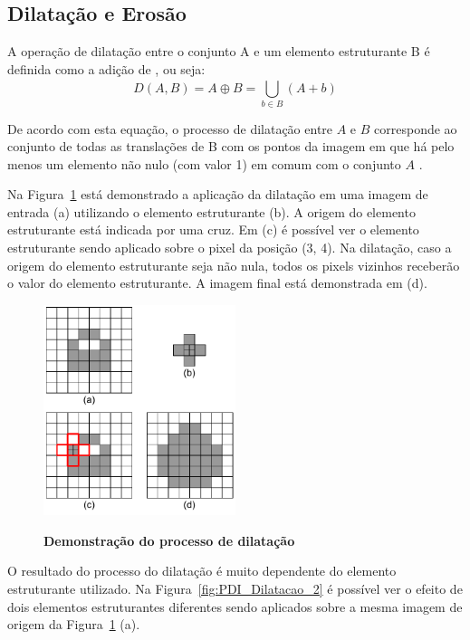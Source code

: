 \documentclass[12pt,oneside,a4paper,english,french,spanish,brazil,]{abntex2}
\begin{document}
\subsection{Dilatação e Erosão}

A operação de dilatação entre o conjunto A e um elemento estruturante B é definida como a adição de \citet{minkowski:1911}, ou seja: \[D(A,B)=A\oplus B=\bigcup_{b\in B}^{ } (A+b)\]

De acordo com esta equação, o processo de dilatação entre \(A\) e \(B\) corresponde ao conjunto de todas as translações de B com os pontos da imagem em que há pelo menos um elemento não nulo (com valor 1) em comum com o conjunto \(A\) \cite{pedrini:2008}. 

Na Figura~\ref{fig:PDI_Dilatacao_1} está demonstrado a aplicação da dilatação em uma imagem de entrada (a) utilizando o elemento estruturante (b). A origem do elemento estruturante está indicada por uma cruz. Em (c) é possível ver o elemento estruturante sendo aplicado sobre o pixel da posição (3, 4). Na dilatação, caso a origem do elemento estruturante seja não nula, todos os pixels vizinhos receberão o valor do elemento estruturante. A imagem final está demonstrada em (d).

\begin{figure}[ht]
\centering
\caption{\textbf{Demonstração do processo de dilatação}}
\includegraphics[width=0.5\textwidth]{imagens/PDI_Dilatacao_1.pdf}
\sourceAuthor
\label{fig:PDI_Dilatacao_1}
\end{figure}

O resultado do processo do dilatação é muito dependente do elemento estruturante utilizado. Na Figura~\ref{fig:PDI_Dilatacao_2} é possível ver o efeito de dois elementos estruturantes diferentes sendo aplicados sobre a mesma imagem de origem da Figura~\ref{fig:PDI_Dilatacao_1} (a).
\end{document}
